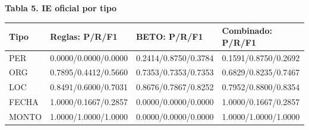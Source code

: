 \par\medskip\noindent\begin{minipage}{\linewidth}
\textbf{Tabla 5. IE oficial por tipo}\par\smallskip
\begin{tabularx}{\linewidth}{@{}lYYY@{}}\toprule
Tipo & Reglas: P/\allowbreak{}R/\allowbreak{}F1 & BETO: P/\allowbreak{}R/\allowbreak{}F1 & Combinado: P/\allowbreak{}R/\allowbreak{}F1 \\ \midrule
PER & 0.0000/\allowbreak{}0.0000/\allowbreak{}0.0000 & 0.2414/\allowbreak{}0.8750/\allowbreak{}0.3784 & 0.1591/\allowbreak{}0.8750/\allowbreak{}0.2692 \\
ORG & 0.7895/\allowbreak{}0.4412/\allowbreak{}0.5660 & 0.7353/\allowbreak{}0.7353/\allowbreak{}0.7353 & 0.6829/\allowbreak{}0.8235/\allowbreak{}0.7467 \\
LOC & 0.8491/\allowbreak{}0.6000/\allowbreak{}0.7031 & 0.8676/\allowbreak{}0.7867/\allowbreak{}0.8252 & 0.7952/\allowbreak{}0.8800/\allowbreak{}0.8354 \\
FECHA & 1.0000/\allowbreak{}0.1667/\allowbreak{}0.2857 & 0.0000/\allowbreak{}0.0000/\allowbreak{}0.0000 & 1.0000/\allowbreak{}0.1667/\allowbreak{}0.2857 \\
MONTO & 1.0000/\allowbreak{}1.0000/\allowbreak{}1.0000 & 0.0000/\allowbreak{}0.0000/\allowbreak{}0.0000 & 1.0000/\allowbreak{}1.0000/\allowbreak{}1.0000 \\
\bottomrule\end{tabularx}\end{minipage}\par\medskip
